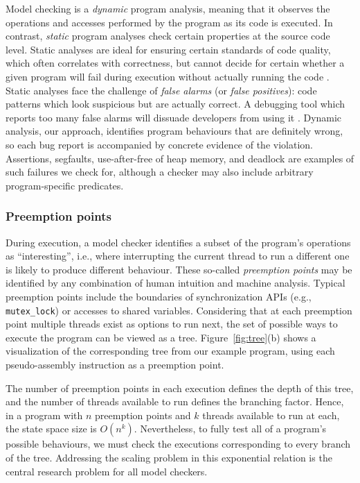 Model checking is a {\em dynamic} program analysis, meaning that it observes the operations and accesses performed by the program as its code is executed.
In contrast, {\em static} program analyses check certain properties at the source code level.
Static analyses are ideal for ensuring certain standards of code quality, which often correlates with correctness,
but cannot decide for certain whether a given program will fail during execution without actually running the code \cite{incompleteness}.
Static analyses face the challenge of {\em false alarms} (or {\em false positives}):
code patterns which look suspicious but are actually correct.
A debugging tool which reports too many false alarms will dissuade developers from using it \cite{racerx}.
Dynamic analysis, our approach, identifies program behaviours that are definitely wrong,
so each bug report is accompanied by concrete evidence of the violation.
Assertions, segfaults, use-after-free of heap memory, and deadlock are examples of such failures we check for,
although a checker may also include arbitrary program-specific predicates.

\subsubsection{Preemption points}

During execution, a model checker identifies a subset of the program's operations as ``interesting'', i.e.,
where interrupting the current thread to run a different one is likely to produce different behaviour.
These so-called {\em preemption points} may be identified by any combination of human intuition and machine analysis.
Typical preemption points include the boundaries of synchronization APIs (e.g., {\tt mutex\_lock}) or accesses to shared variables.
Considering that at each preemption point multiple threads exist as options to run next,
the set of possible ways to execute the program can be viewed as a tree.
Figure~\ref{fig:tree}(b) shows a visualization of the corresponding tree from our example program,
using each pseudo-assembly instruction as a preemption point.

The number of preemption points in each execution defines the depth of this tree,
and the number of threads available to run defines the branching factor.
Hence, in a program with $n$ preemption points and $k$ threads available to run at each, the state space size is $O(n^k)$.
Nevertheless, to fully test all of a program's possible behaviours, we must check the executions corresponding to every branch of the tree.
Addressing the scaling problem in this exponential relation is the central research problem for all model checkers.

